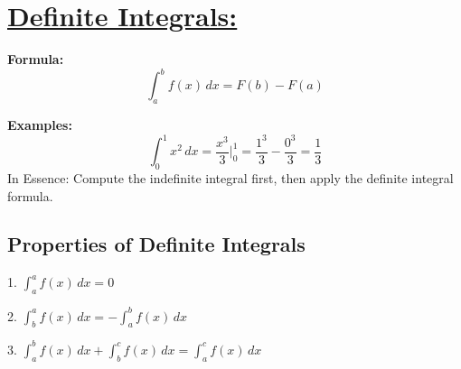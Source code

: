 \documentclass[12pt, letterpaper]{article}
\begin{document}
    \section{\underline{Definite Integrals:}}
        \textnormal{\textbf{Formula:}}
    \begin{equation}
        \int_a^bf(x)\,dx=F(b)-F(a)
    \end{equation}
    \begin{flushleft}
        \textbf{Examples:}\\
        $$\int_0^1x^2\,dx=\frac{x^3}{3}\bigg|_0^1=\frac{1^3}{3}-\frac{0^3}{3}=\frac{1}{3}$$
        In Essence: Compute the indefinite integral first, then apply the definite integral formula. \\
    \end{flushleft}
    \subsection*{Properties of Definite Integrals}
    \begin{description}
        \item 1. $\int_a^af(x)\,dx=0$
        \item 2. $\int_b^af(x)\,dx=-\int_a^bf(x)\,dx$
        \item 3. $\int_a^bf(x)\,dx+\int_b^cf(x)\,dx=\int_a^cf(x)\,dx$
    \end{description}
\end{document}
